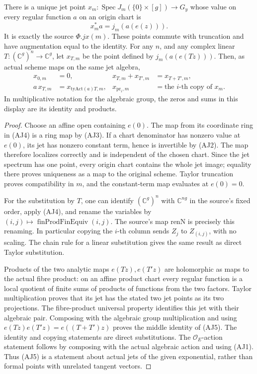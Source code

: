 \begin{srlemma}
\label{lem:ftb-actual-exponential-jet-points}
There is a unique jet point \(x_m:\operatorname{Spec}J_m(\{0\}\times[g])
\to G_y\) whose value on every regular function \(a\) on an
origin chart is
\[
                         x_m^*a=j_m(a(e(z))).             \tag{AJ4}
\]
It is exactly the source \(\Phi.jx(m)\).
These points commute with truncation and have augmentation equal
to the identity. For any \(n\), and any complex linear
\(T:(\mathbb C^g)^n\to\mathbb C^g\), let \(x_{T,m}\) be the
point defined by \(j_m(a(e(Tz)))\).
Then, as actual scheme maps on the same jet algebra,
\[
 \begin{aligned}
 x_{0,m}&=0,&
 x_{T,m}+x_{T',m}&=x_{T+T',m},\\
 a\,x_{T,m}&=x_{\mathrm{tyAct}(a)T,m},&
 x_{\mathrm{pr}_i,m}&=\text{the \(i\)-th copy of }x_m.
 \end{aligned}                                             \tag{AJ5}
\]
In multiplicative notation for the algebraic group, the zeros
and sums in this display are its identity and products.
\end{srlemma}

\begin{proof}
Choose an affine open containing \(e(0)\).
The map from its coordinate ring in (AJ4) is a ring map by (AJ3).
If a chart denominator has nonzero value at \(e(0)\), its jet
has nonzero constant term, hence is invertible by (AJ2).
The map therefore localizes correctly and is independent of the
chosen chart. Since the jet spectrum has one point, every
origin chart contains the whole jet image; equality there
proves uniqueness as a map to the original scheme.
Taylor truncation proves compatibility in \(m\), and the
constant-term map evaluates at \(e(0)=0\).

For the substitution by \(T\), one can identify
\((\mathbb C^g)^n\) with \(\mathbb C^{ng}\) in the source's
fixed order, apply (AJ4), and rename the variables by
\((i,j)\mapsto\operatorname{finProdFinEquiv}(i,j)\).
The source's map \(\mathrm{renN}\) is precisely this renaming.
In particular copying the \(i\)-th column sends \(Z_j\) to
\(Z_{(i,j)}\), with no scaling.
The chain rule for a linear substitution gives the same result
as direct Taylor substitution.

Products of the two analytic maps \(e(Tz),e(T'z)\) are
holomorphic as maps to the actual fibre product:
on an affine product chart every regular function is a
local quotient of finite sums of products of functions from
the two factors. Taylor multiplication proves that its jet
has the stated two jet points as its two projections.
The fibre-product universal property identifies this jet with
their algebraic pair.
Composing with the algebraic group multiplication and using
\(e(Tz)e(T'z)=e((T+T')z)\) proves the middle identity of (AJ5).
The identity and copying statements are direct substitutions.
The \(\mathcal O_E\)-action statement follows by composing with
the actual algebraic action and using (AJ1).
Thus (AJ5) is a statement about actual jets of the given
exponential, rather than formal points with unrelated tangent
vectors.
\end{proof}

